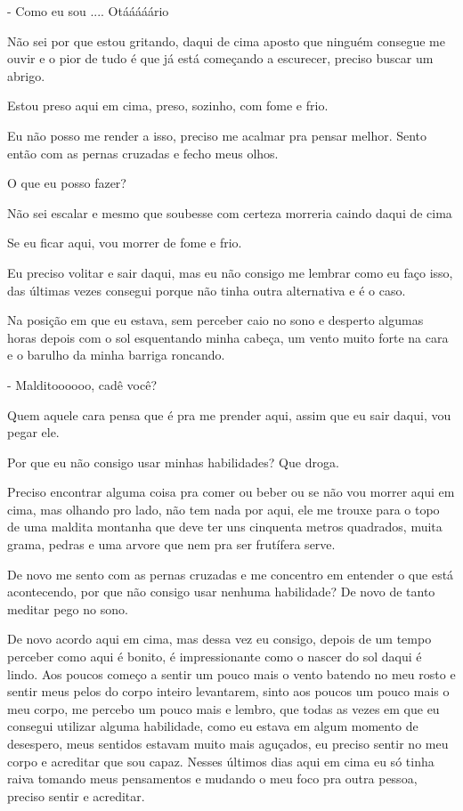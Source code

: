 - Como eu sou .... Otááááário

Não sei por que estou gritando, daqui de cima aposto que ninguém consegue me ouvir e o pior de tudo é que já está começando a escurecer, preciso buscar um abrigo.

Estou preso aqui em cima, preso, sozinho, com fome e frio.

Eu não posso me render a isso, preciso me acalmar pra pensar melhor. Sento então com as pernas cruzadas e fecho meus olhos. 

O que eu posso fazer? 

Não sei escalar e mesmo que soubesse com certeza morreria caindo daqui de cima

Se eu ficar aqui, vou morrer de fome e frio.

Eu preciso volitar e sair daqui, mas eu não consigo me lembrar como eu faço isso, das últimas vezes consegui porque não tinha outra alternativa e é o caso.

Na posição em que eu estava, sem perceber caio no sono e desperto algumas horas depois com o sol esquentando minha cabeça, um vento muito forte na cara e o barulho da minha barriga roncando.

- Malditoooooo, cadê você?

Quem aquele cara pensa que é pra me prender aqui, assim que eu sair daqui, vou pegar ele.

Por que eu não consigo usar minhas habilidades? Que droga.

Preciso encontrar alguma coisa pra comer ou beber ou se não vou morrer aqui em cima, mas olhando pro lado, não tem nada por aqui, ele me trouxe para o topo de uma maldita montanha que deve ter uns cinquenta metros quadrados, muita grama, pedras e uma arvore que nem pra ser frutífera serve.

De novo me sento com as pernas cruzadas e me concentro em entender o que está acontecendo, por que não consigo usar nenhuma habilidade? De novo de tanto meditar pego no sono.

De novo acordo aqui em cima, mas dessa vez eu consigo, depois de um tempo perceber como aqui é bonito, é impressionante como o nascer do sol daqui é lindo. Aos poucos começo a sentir um pouco mais o vento batendo no meu rosto e sentir meus pelos do corpo inteiro levantarem, sinto aos poucos um pouco mais o meu corpo, me percebo um pouco mais e lembro, que todas as vezes em que eu consegui utilizar alguma habilidade, como eu estava em algum momento de desespero, meus sentidos estavam muito mais aguçados, eu preciso sentir no meu corpo e acreditar que sou capaz. Nesses últimos dias aqui em cima eu só tinha raiva tomando meus pensamentos e mudando o meu foco pra outra pessoa, preciso sentir e acreditar.

